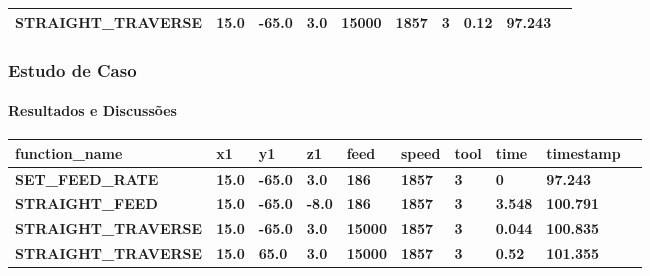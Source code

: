 \documentclass[aspectratio=169]{beamer}
\begin{document}
{\begin{frame}[fragile]
\begin{tabular}{|l|l|l|l|l|l|l|l|l|l|}
    \tiny{\bfseries{STRAIGHT\_TRAVERSE}} & 
    \tiny{\bfseries{15.0}} & 
    \tiny{\bfseries{-65.0}} & 
    \tiny{\bfseries{3.0}} & 
    \tiny{\bfseries{15000}} & 
    \tiny{\bfseries{1857}} & 
    \tiny{\bfseries{3}} & 
    \tiny{\bfseries{0.12}} & 
    \tiny{\bfseries{97.243}} \\
    \hline

  \end{tabular}

\end{frame}  


\begin{frame}[fragile]
  \frametitle{Estudo de Caso}
  \framesubtitle{Resultados e Discussões}

    \begin{tabular}{|l|l|l|l|l|l|l|l|l|l|}

      \hline

      \tiny{\bfseries{function\_name}} & 
      \tiny{\bfseries{x1}} & 
      \tiny{\bfseries{y1}} & 
      \tiny{\bfseries{z1}} & 
      \tiny{\bfseries{feed}} & 
      \tiny{\bfseries{speed}} & 
      \tiny{\bfseries{tool}} & 
      \tiny{\bfseries{time}} & 
      \tiny{\bfseries{timestamp}} \\
      \hline
    

      \tiny{\bfseries{SET\_FEED\_RATE}} & 
      \tiny{\bfseries{15.0}} & 
      \tiny{\bfseries{-65.0}} & 
      \tiny{\bfseries{3.0}} & 
      \tiny{\bfseries{186}} & 
      \tiny{\bfseries{1857}} & 
      \tiny{\bfseries{3}} & 
      \tiny{\bfseries{0}} & 
      \tiny{\bfseries{97.243}} \\
      \hline

      \tiny{\bfseries{STRAIGHT\_FEED}} & 
      \tiny{\bfseries{15.0}} & 
      \tiny{\bfseries{-65.0}} & 
      \tiny{\bfseries{-8.0}} & 
      \tiny{\bfseries{186}} & 
      \tiny{\bfseries{1857}} & 
      \tiny{\bfseries{3}} & 
      \tiny{\bfseries{3.548}} & 
      \tiny{\bfseries{100.791}} \\
      \hline

      \tiny{\bfseries{STRAIGHT\_TRAVERSE}} & 
      \tiny{\bfseries{15.0}} & 
      \tiny{\bfseries{-65.0}} & 
      \tiny{\bfseries{3.0}} & 
      \tiny{\bfseries{15000}} & 
      \tiny{\bfseries{1857}} & 
      \tiny{\bfseries{3}} & 
      \tiny{\bfseries{0.044}} & 
      \tiny{\bfseries{100.835}} \\
      \hline

      \tiny{\bfseries{STRAIGHT\_TRAVERSE}} & 
      \tiny{\bfseries{15.0}} & 
      \tiny{\bfseries{65.0}} & 
      \tiny{\bfseries{3.0}} & 
      \tiny{\bfseries{15000}} & 
      \tiny{\bfseries{1857}} & 
      \tiny{\bfseries{3}} & 
      \tiny{\bfseries{0.52}} & 
      \tiny{\bfseries{101.355}} \\
      \hline    


\end{tabular}
\end{frame}}
\end{document}
